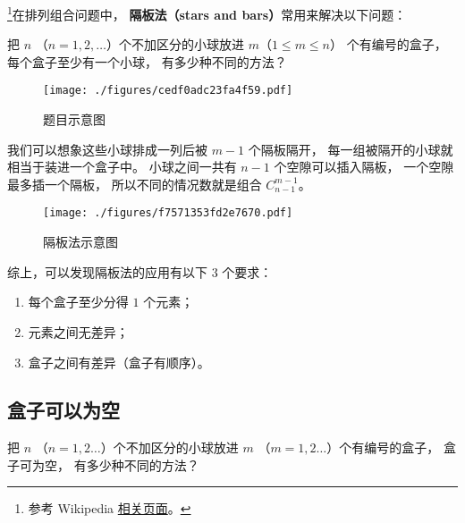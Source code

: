 

\footnote{参考 Wikipedia \href{https://en.wikipedia.org/wiki/Stars_and_bars_(combinatorics)}{相关页面}。}在排列组合问题中， \textbf{隔板法（stars and bars）}常用来解决以下问题：

\begin{example}{}
把 $n$ （$n = 1,2,\dots$）个不加区分的小球放进 $m$（$1\leqslant m\leqslant n$） 个有编号的盒子， 每个盒子至少有一个小球， 有多少种不同的方法？
\begin{figure}[ht]
\centering
\texttt{[image: ./figures/cedf0adc23fa4f59.pdf]}
\caption{题目示意图} \label{fig_BarCom_1}
\end{figure}
\end{example}

我们可以想象这些小球排成一列后被 $m-1$ 个隔板隔开， 每一组被隔开的小球就相当于装进一个盒子中。 小球之间一共有 $n-1$ 个空隙可以插入隔板， 一个空隙最多插一个隔板， 所以不同的情况数就是组合 $C_{n-1}^{m-1}$。
\begin{figure}[ht]
\centering
\texttt{[image: ./figures/f7571353fd2e7670.pdf]}
\caption{隔板法示意图} \label{fig_BarCom_2}
\end{figure}

综上，可以发现隔板法的应用有以下 $3$ 个要求：
\begin{enumerate}
\item 每个盒子至少分得 $1$ 个元素；
\item 元素之间无差异；
\item 盒子之间有差异（盒子有顺序）。
\end{enumerate}


\subsection{盒子可以为空}


\begin{example}{}
把 $n$ （$n=1,2\dots$）个不加区分的小球放进 $m$ （$m=1,2\dots$）个有编号的盒子， 盒子可为空， 有多少种不同的方法？
\end{example}


